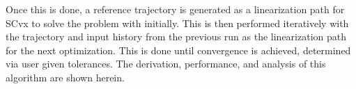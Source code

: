 Once this is done, a reference trajectory is generated as a linearization path for SCvx to solve the problem with initially. This is then performed iteratively with the trajectory and input history from the previous run as the linearization path for the next optimization. This is done until convergence is achieved, determined via user given tolerances. The derivation, performance, and analysis of this algorithm are shown herein.

















